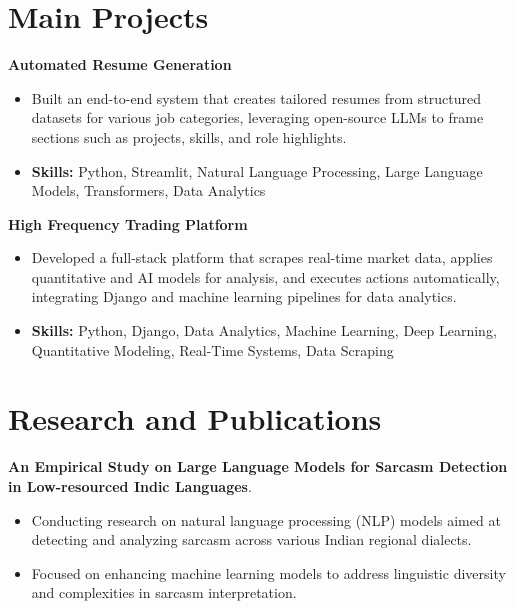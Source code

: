 \documentclass[a4paper,11pt]{article}
\begin{document}
\section{\textbf{Main Projects}}

\vspace{1mm}
  \textbf{Automated Resume Generation  }
\vspace{-1.5mm} %
\begin{itemize}
  \item Built an end-to-end system that creates tailored resumes from structured datasets for various job categories, leveraging open-source LLMs to frame sections such as projects, skills, and role highlights.
\vspace{-3mm}
  \item \textbf{Skills:} Python, Streamlit, Natural Language Processing, Large Language Models, Transformers, Data Analytics
\end{itemize}


\vspace{1mm}
   \textbf{High Frequency Trading Platform }
\vspace{-1.5mm} %
\begin{itemize}
  \item Developed a full-stack platform that scrapes real-time market data, applies quantitative and AI models for analysis, and executes actions automatically, integrating Django and machine learning pipelines for data analytics.
\vspace{-3mm}
  \item \textbf{Skills:} Python, Django, Data Analytics, Machine Learning, Deep Learning, Quantitative Modeling, Real-Time Systems, Data Scraping
\end{itemize}



\section{\textbf{Research and Publications} \hfill }
\vspace{1mm}
  \textbf{An Empirical Study on Large Language Models for Sarcasm Detection in Low-resourced Indic Languages}.
\vspace{-1mm} %
\begin{itemize}
  \item Conducting research on natural language processing (NLP) models aimed at detecting and analyzing sarcasm across various Indian regional dialects.
\vspace{-3mm}
  \item Focused on enhancing machine learning models to address linguistic diversity and complexities in sarcasm interpretation.
\end{itemize}
\end{document}
